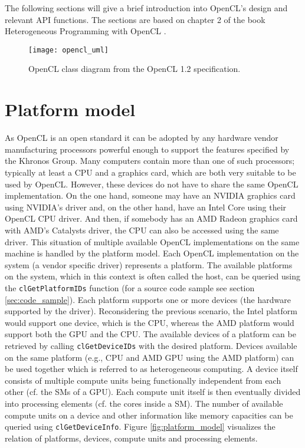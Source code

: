 The following sections will give a brief introduction into OpenCL's design and relevant API functions. The sections are based on chapter 2 of the book Heterogeneous Programming with OpenCL \cite[p.15-31]{opencl_book}.

\begin{figure}
\centering
\texttt{[image: opencl\_uml]}
\caption{OpenCL class diagram from the OpenCL 1.2 specification. \cite{opencl_spec}}
\label{fig:opencl_uml}
\end{figure}

\section{Platform model}
As OpenCL is an open standard it can be adopted by any hardware vendor manufacturing processors powerful enough to support the features specified by the Khronos Group. Many computers contain more than one of such processors; typically at least a CPU and a graphics card, which are both very suitable to be used by OpenCL. However, these devices do not have to share the same OpenCL implementation. On the one hand, someone may have an NVIDIA graphics card using NVIDIA's driver and, on the other hand, have an Intel Core using their OpenCL CPU driver. And then, if somebody has an AMD Radeon graphics card with AMD's Catalysts driver, the CPU can also be accessed using the same driver.
This situation of multiple available OpenCL implementations on the same machine is handled by the platform model. Each OpenCL implementation on the system (a vendor specific driver) represents a platform. The available platforms on the system, which in this context is often called the host, can be queried using the \lstinline!clGetPlatformIDs! function (for a source code sample see section \ref{sec:code_sample}).
Each platform supports one or more devices (the hardware supported by the driver). Reconsidering the previous scenario, the Intel platform would support one device, which is the CPU, whereas the AMD platform would support both the GPU and the CPU. The available devices of a platform can be retrieved by calling \lstinline!clGetDeviceIDs! with the desired platform. Devices available on the same platform (e.g., CPU and AMD GPU using the AMD platform) can be used together which is referred to as heterogeneous computing. 
A device itself consists of multiple compute units being functionally independent from each other (cf. the SMs of a GPU). Each compute unit itself is then eventually divided into processing elements (cf. the cores inside a SM). The number of available compute units on a device and other information like memory capacities can be queried using \lstinline!clGetDeviceInfo!.
Figure \ref{fig:platform_model} visualizes the relation of platforms, devices, compute units and processing elements. \cite[pp.19]{opencl_book}

